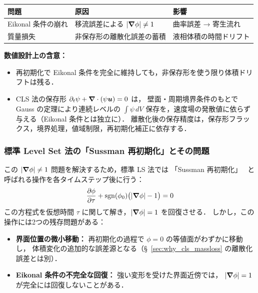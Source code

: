 \begin{tcolorbox}[mybox, title={2つの問題の独立性：数値設計上の含意}]
\begin{center}
\renewcommand{\arraystretch}{\PaperTableArrayStretch}
\begin{tabular}{lll}
\hline
問題 & 原因 & 影響 \\
\hline
Eikonal 条件の崩れ & 移流誤差による $|\bm{\nabla}\phi|\neq 1$ & 曲率誤差 → 寄生流れ \\
質量損失 & 非保存形の離散化誤差の蓄積 & 液相体積の時間ドリフト \\
\hline
\end{tabular}
\end{center}
\medskip
\textbf{数値設計上の含意：}
\begin{itemize}
  \item 再初期化で Eikonal 条件を完全に維持しても，非保存形を使う限り体積ドリフトは残る．
  \item CLS 法の保存形 $\partial_t\psi + \bm{\nabla}\cdot(\psi\bm{u}) = 0$ は，
        壁面・周期境界条件のもとで Gauss の定理により連続レベルの
        $\int\psi\,dV$ 保存を，速度場の発散値に依らず与える（Eikonal 条件とは独立に）．
        離散化後の保存精度は，保存形フラックス，境界処理，値域制限，再初期化補正に依存する．
\end{itemize}
\end{tcolorbox}

\subsubsection{標準 Level Set 法の「Sussman 再初期化」とその問題}

この $|\bm{\nabla}\phi|\neq 1$ 問題を解決するため，標準 LS 法では
「Sussman 再初期化」~\cite{Sussman1994, Sussman1999} と呼ばれる操作を各タイムステップ後に行う：
\begin{equation}
  \dfrac{\partial \phi}{\partial \tau} + \operatorname{sgn}(\phi_0)\bigl(|\bm{\nabla}\phi| - 1\bigr) = 0
  \label{eq:sussman_reinit}
\end{equation}
この方程式を仮想時間 $\tau$ に関して解き，$|\bm{\nabla}\phi|=1$ を回復させる．
しかし，この操作には2つの残存問題がある：
\begin{itemize}
  \item \textbf{界面位置の微小移動：} 再初期化の過程で $\phi=0$ の等値面がわずかに移動し，
        体積変化の追加的な誤差源となる（§~\ref{sec:why_cls_massloss} の離散化誤差とは別）．
  \item \textbf{Eikonal 条件の不完全な回復：} 強い変形を受けた界面近傍では，
        $|\bm{\nabla}\phi|=1$ が完全には回復しないことがある．
\end{itemize}

